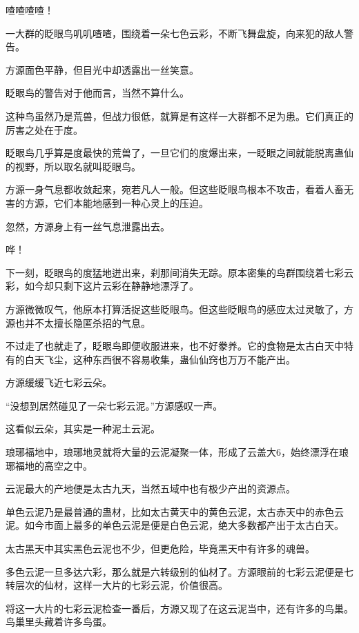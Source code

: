
\begin{this_body}

喳喳喳喳！

一大群的眨眼鸟叽叽喳喳，围绕着一朵七色云彩，不断飞舞盘旋，向来犯的敌人警告。

方源面色平静，但目光中却透露出一丝笑意。

眨眼鸟的警告对于他而言，当然不算什么。

这种鸟虽然乃是荒兽，但战力很低，就算是有这样一大群都不足为患。它们真正的厉害之处在于度。

眨眼鸟几乎算是度最快的荒兽了，一旦它们的度爆出来，一眨眼之间就能脱离蛊仙的视野，所以取名就叫眨眼鸟。

方源一身气息都收敛起来，宛若凡人一般。但这些眨眼鸟根本不攻击，看着人畜无害的方源，它们本能地感到一种心灵上的压迫。

忽然，方源身上有一丝气息泄露出去。

哗！

下一刻，眨眼鸟的度猛地迸出来，刹那间消失无踪。原本密集的鸟群围绕着七彩云彩，如今却只剩下这片云彩在静静地漂浮了。

方源微微叹气，他原本打算活捉这些眨眼鸟。但这些眨眼鸟的感应太过灵敏了，方源也并不太擅长隐匿杀招的气息。

不过走了也就走了，眨眼鸟即便收服进来，也不好豢养。它的食物是太古白天中特有的白天飞尘，这种东西很不容易收集，蛊仙仙窍也万万不能产出。

方源缓缓飞近七彩云朵。

“没想到居然碰见了一朵七彩云泥。”方源感叹一声。

这看似云朵，其实是一种泥土云泥。

琅琊福地中，琅琊地灵就将大量的云泥凝聚一体，形成了云盖大6，始终漂浮在琅琊福地的高空之中。

云泥最大的产地便是太古九天，当然五域中也有极少产出的资源点。

单色云泥乃是最普通的蛊材，比如太古黄天中的黄色云泥，太古赤天中的赤色云泥。如今市面上最多的单色云泥是便是白色云泥，绝大多数都产出于太古白天。

太古黑天中其实黑色云泥也不少，但更危险，毕竟黑天中有许多的魂兽。

多色云泥一旦多达六彩，那么就是六转级别的仙材了。方源眼前的七彩云泥便是七转层次的仙材，这样一大片的七彩云泥，价值很高。

将这一大片的七彩云泥检查一番后，方源又现了在这云泥当中，还有许多的鸟巢。鸟巢里头藏着许多鸟蛋。


\end{this_body}
